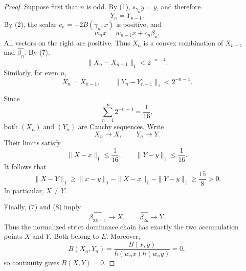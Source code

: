 \documentclass[11pt,reqno]{amsart}
\theoremstyle{plain}
\theoremstyle{definition}
\theoremstyle{remark}
\numberwithin{equation}{section}
\begin{document}
\begin{proof}
Suppose first that $n$ is odd. By (1),
$s_{\gamma_n}y=y$, and therefore
\[
Y_n=Y_{n-1}.
\]
By (2), the scalar $c_n=-2B(\gamma_n,x)$ is positive, and
\[
w_nx=w_{n-1}x+c_n\beta_n.
\]
All vectors on the right are positive. Thus $X_n$ is a convex
combination of $X_{n-1}$ and $\widehat{\beta_n}$. By (7),
\[
\|X_n-X_{n-1}\|_1<2^{-n-4}.
\tag{11}
\]
Similarly, for even $n$,
\[
X_n=X_{n-1},
\qquad
\|Y_n-Y_{n-1}\|_1<2^{-n-4}.
\tag{12}
\]

Since
\[
\sum_{n=1}^{\infty}2^{-n-4}=\frac1{16},
\]
both $(X_n)$ and $(Y_n)$ are Cauchy sequences. Write
\[
X_n\longrightarrow X,\qquad Y_n\longrightarrow Y.
\]
Their limits satisfy
\[
\|X-x\|_1\leq\frac1{16},
\qquad
\|Y-y\|_1\leq\frac1{16}.
\]
It follows that
\[
\|X-Y\|_1
\geq\|x-y\|_1-\|X-x\|_1-\|Y-y\|_1
\geq\frac{15}{8}>0.
\]
In particular, $X\neq Y$.

Finally, (7) and (8) imply
\[
\widehat{\beta_{2k-1}}\longrightarrow X,
\qquad
\widehat{\beta_{2k}}\longrightarrow Y.
\]
Thus the normalized strict dominance chain has exactly the two
accumulation points $X$ and $Y$. Both belong to $E$. Moreover,
\[
B(X_n,Y_n)
=\frac{B(x,y)}{h(w_nx)h(w_ny)}=0,
\]
so continuity gives $B(X,Y)=0$.
\end{proof}
\end{document}

